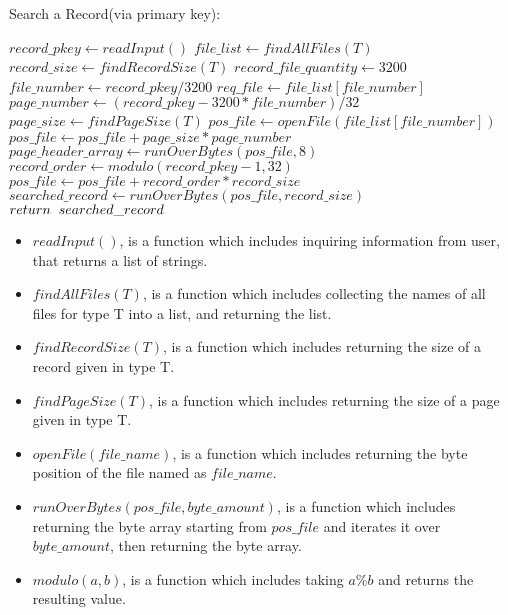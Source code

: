 \documentclass[12pt]{report}
\begin{document}
\begin{algorithm}
\caption{Search a Record(via primary key):}
\begin{algorithmic}[1]
	\STATE $record\_pkey \leftarrow readInput()$
	\STATE $file\_list \leftarrow findAllFiles(T)$
	\STATE $record\_size \leftarrow findRecordSize(T)$
	\STATE $record\_file\_quantity \leftarrow 3200$
	\STATE $file\_number \leftarrow record\_pkey / 3200$
	\STATE $req\_file \leftarrow file\_list[file\_number]$
	\STATE $page\_number \leftarrow (record\_pkey - 3200 * file\_number) / 32$
	\STATE $page\_size \leftarrow findPageSize(T)$
	\STATE $pos\_file \leftarrow openFile(file\_list[file\_number])$
	\STATE $pos\_file \leftarrow pos\_file + page\_size * page\_number$
	\STATE $page\_header\_array \leftarrow runOverBytes(pos\_file, 8)$
	\STATE $record\_order \leftarrow modulo(record\_pkey - 1, 32)$
	\STATE $pos\_file \leftarrow pos\_file + record\_order * record\_size$
	\STATE $searched\_record \leftarrow runOverBytes(pos\_file, record\_size)$
	\STATE $return\hspace{0.2cm}searched\_record$
\end{algorithmic}
\end{algorithm}

\begin{itemize}
\item $readInput()$, is a function which includes inquiring information from user, that returns a list of strings.
\item $findAllFiles(T)$, is a function which includes collecting the names of all files for type T into a list, and returning the list.
\item $findRecordSize(T)$, is a function which includes returning the size of a record given in type T.
\item $findPageSize(T)$, is a function which includes returning the size of a page given in type T.
\item $openFile(file\_name)$, is a function which includes returning the byte position of the file named as $file\_name$.
\item $runOverBytes(pos\_file, byte\_amount)$, is a function which includes returning the byte array starting from $pos\_file$ and iterates it over $byte\_amount$, then returning the byte array.
\item $modulo(a,b)$, is a function which includes taking $a\%b$ and returns the resulting value.
\end{itemize}
\end{document}

